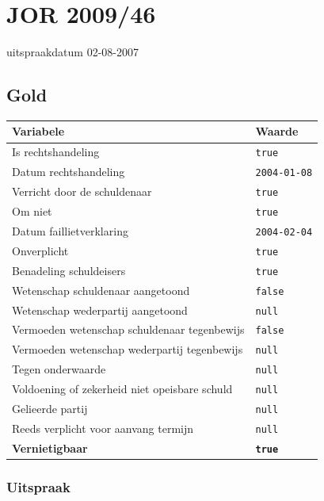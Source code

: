 \documentclass[
  dutch,
  a4paper,
]{article}
\begin{document}
\newpage


\section{JOR 2009/46}\label{jor-200946}

uitspraakdatum 02-08-2007

\subsection{Gold}\label{gold-5}

\begin{center}
\small
\begin{tabular}{@{}p{8cm}p{2.6cm}@{}}
\toprule
Variabele & Waarde \\
\midrule
Is rechtshandeling & \texttt{true} \\
Datum rechtshandeling & \texttt{2004-01-08} \\
Verricht door de schuldenaar & \texttt{true} \\
Om niet & \texttt{true} \\
Datum faillietverklaring & \texttt{2004-02-04} \\
Onverplicht & \texttt{true} \\
Benadeling schuldeisers & \texttt{true} \\
Wetenschap schuldenaar aangetoond & \texttt{false} \\
Wetenschap wederpartij aangetoond & \texttt{null} \\
Vermoeden wetenschap schuldenaar tegenbewijs & \texttt{false} \\
Vermoeden wetenschap wederpartij tegenbewijs & \texttt{null} \\
Tegen onderwaarde & \texttt{null} \\
Voldoening of zekerheid niet opeisbare schuld & \texttt{null} \\
Gelieerde partij & \texttt{null} \\
Reeds verplicht voor aanvang termijn & \texttt{null} \\
\textbf{Vernietigbaar} & \textbf{\texttt{true}} \\
\bottomrule
\end{tabular}
\end{center}

\subsubsection{Uitspraak}\label{uitspraak-5}
\end{document}
